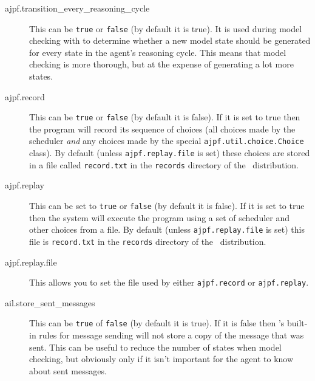 \begin{description}
\item[ajpf.transition\_every\_reasoning\_cycle] This can be \texttt{true} or \texttt{false} (by default it is true).  It is used during model checking with \ajpf{} to determine whether a new model state should be generated for every state in the agent's reasoning cycle.  This means that model checking is more thorough, but at the expense of generating a lot more states.
\item[ajpf.record] This can be \texttt{true} or \texttt{false} (by default  it is false).  If it is set to true then the program will record its sequence of choices (all choices made by the scheduler \emph{and} any choices made by the special \texttt{ajpf.util.choice.Choice} class).  By default (unless \texttt{ajpf.replay.file} is set) these choices are stored in a file called \texttt{record.txt} in the \texttt{records} directory of the \mcapl\ distribution.
\item[ajpf.replay] This can be set to \texttt{true} or \texttt{false} (by default it is false).  If it is set to true then the system will execute the program using a set of scheduler and other choices from a file.  By default (unless \texttt{ajpf.replay.file} is set) this  file is  \texttt{record.txt} in the \texttt{records} directory of the \mcapl\ distribution.
\item[ajpf.replay.file] This allows you to set the file used by either \texttt{ajpf.record} or \texttt{ajpf.replay}.
\item[ail.store\_sent\_messages]  This can be \texttt{true} of \texttt{false} (by default it is true).  If it is false then \ail{}'s built-in rules for message sending will not store a copy of the message that was sent.  This can be useful to reduce the number of states when model checking, but obviously only if it isn't important for the agent to know about sent messages.
\end{description}

